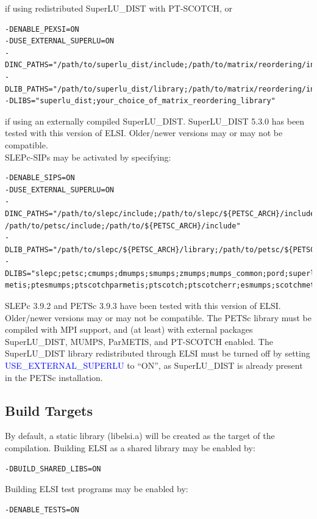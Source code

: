 \documentclass{report}
\begin{document}
if using redistributed SuperLU\_DIST with PT-SCOTCH, or
\begin{verbatim}
-DENABLE_PEXSI=ON
-DUSE_EXTERNAL_SUPERLU=ON
-DINC_PATHS="/path/to/superlu_dist/include;/path/to/matrix/reordering/include"
-DLIB_PATHS="/path/to/superlu_dist/library;/path/to/matrix/reordering/include"
-DLIBS="superlu_dist;your_choice_of_matrix_reordering_library"
\end{verbatim}

if using an externally compiled SuperLU\_DIST.  SuperLU\_DIST 5.3.0 has been tested with this version of ELSI.  Older/newer versions may or may not be compatible.\\

SLEPc-SIPs may be activated by specifying:
\begin{verbatim}
-DENABLE_SIPS=ON
-DUSE_EXTERNAL_SUPERLU=ON
-DINC_PATHS="/path/to/slepc/include;/path/to/slepc/${PETSC_ARCH}/include;
/path/to/petsc/include;/path/to/${PETSC_ARCH}/include"
-DLIB_PATHS="/path/to/slepc/${PETSC_ARCH}/library;/path/to/petsc/${PETSC_ARCH}/library"
-DLIBS="slepc;petsc;cmumps;dmumps;smumps;zmumps;mumps_common;pord;superlu_dist;parmetis;
metis;ptesmumps;ptscotchparmetis;ptscotch;ptscotcherr;esmumps;scotchmetis;scotch;scotcherr"
\end{verbatim}

SLEPc 3.9.2 and PETSc 3.9.3 have been tested with this version of ELSI.  Older/newer versions may or may not be compatible.  The PETSc library must be compiled with MPI support, and (at least) with external packages SuperLU\_DIST, MUMPS, ParMETIS, and PT-SCOTCH enabled.  The SuperLU\_DIST library redistributed through ELSI must be turned off by setting \textcolor{blue}{USE\_EXTERNAL\_SUPERLU} to ``ON'', as SuperLU\_DIST is already present in the PETSc installation.\\

\subsection{Build Targets}
\label{subsec:config_targets}
By default, a static library (libelsi.a) will be created as the target of the compilation.  Building ELSI as a shared library may be enabled by:
\begin{verbatim}
-DBUILD_SHARED_LIBS=ON
\end{verbatim}

Building ELSI test programs may be enabled by:
\begin{verbatim}
-DENABLE_TESTS=ON
\end{verbatim}
\end{document}
